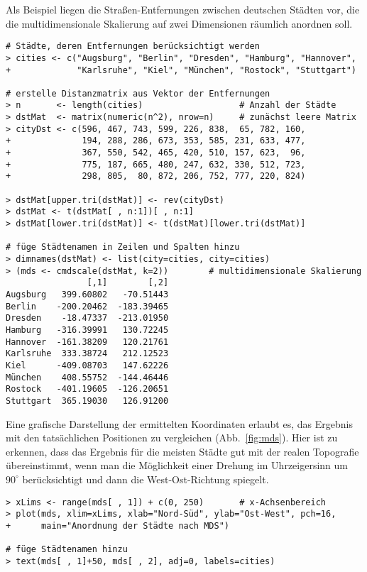 Als Beispiel liegen die Straßen-Entfernungen zwischen deutschen Städten vor, die die multidimensionale Skalierung auf zwei Dimensionen räumlich anordnen soll.
\begin{lstlisting}
# Städte, deren Entfernungen berücksichtigt werden
> cities <- c("Augsburg", "Berlin", "Dresden", "Hamburg", "Hannover",
+             "Karlsruhe", "Kiel", "München", "Rostock", "Stuttgart")

# erstelle Distanzmatrix aus Vektor der Entfernungen
> n       <- length(cities)                   # Anzahl der Städte
> dstMat  <- matrix(numeric(n^2), nrow=n)     # zunächst leere Matrix
> cityDst <- c(596, 467, 743, 599, 226, 838,  65, 782, 160,
+              194, 288, 286, 673, 353, 585, 231, 633, 477,
+              367, 550, 542, 465, 420, 510, 157, 623,  96,
+              775, 187, 665, 480, 247, 632, 330, 512, 723,
+              298, 805,  80, 872, 206, 752, 777, 220, 824)

> dstMat[upper.tri(dstMat)] <- rev(cityDst)
> dstMat <- t(dstMat[ , n:1])[ , n:1]
> dstMat[lower.tri(dstMat)] <- t(dstMat)[lower.tri(dstMat)]

# füge Städtenamen in Zeilen und Spalten hinzu
> dimnames(dstMat) <- list(city=cities, city=cities)
> (mds <- cmdscale(dstMat, k=2))        # multidimensionale Skalierung
                [,1]        [,2]
Augsburg   399.60802   -70.51443
Berlin    -200.20462  -183.39465
Dresden    -18.47337  -213.01950
Hamburg   -316.39991   130.72245
Hannover  -161.38209   120.21761
Karlsruhe  333.38724   212.12523
Kiel      -409.08703   147.62226
München    408.55752  -144.46446
Rostock   -401.19605  -126.20651
Stuttgart  365.19030   126.91200
\end{lstlisting}

Eine grafische Darstellung der ermittelten Koordinaten erlaubt es, das Ergebnis mit den tatsächlichen Positionen zu vergleichen (Abb.\ \ref{fig:mds}). Hier ist zu erkennen, dass das Ergebnis für die meisten Städte gut mit der realen Topografie übereinstimmt, wenn man die Möglichkeit einer Drehung im Uhrzeigersinn um $90^{\circ}$ berücksichtigt und dann die West-Ost-Richtung spiegelt.
\begin{lstlisting}
> xLims <- range(mds[ , 1]) + c(0, 250)       # x-Achsenbereich
> plot(mds, xlim=xLims, xlab="Nord-Süd", ylab="Ost-West", pch=16,
+      main="Anordnung der Städte nach MDS")

# füge Städtenamen hinzu
> text(mds[ , 1]+50, mds[ , 2], adj=0, labels=cities)
\end{lstlisting}

